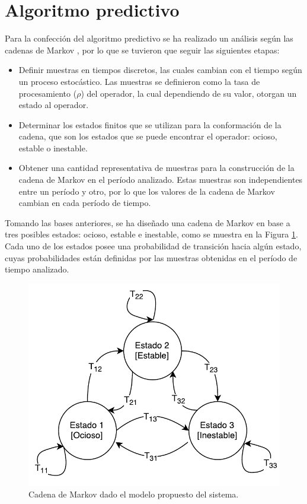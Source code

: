 \section{Algoritmo predictivo}
Para la confecci\'on del algoritmo predictivo se ha realizado un an\'alisis seg\'un las cadenas de Markov \citep{ching2006markov}, por lo que se tuvieron que seguir las siguientes etapas:

\begin{itemize}
	\item Definir muestras en tiempos discretos, las cuales cambian con el tiempo seg\'un un proceso estoc\'astico. Las muestras se definieron como la tasa de procesamiento ($\rho$) del operador, la cual dependiendo de su valor, otorgan un estado al operador.
	\item Determinar los estados finitos que se utilizan para la conformaci\'on de la cadena, que son los estados que se puede encontrar el operador: ocioso, estable o inestable.
	\item Obtener una cantidad representativa de muestras para la construcci\'on de la cadena de Markov en el per\'iodo analizado. Estas muestras son independientes entre un per\'iodo y otro, por lo que los valores de la cadena de Markov cambian en cada per\'iodo de tiempo. %
\end{itemize}

Tomando las bases anteriores, se ha dise\~nado una cadena de Markov en base a tres posibles estados: ocioso, estable e inestable, como se muestra en la Figura \ref{fig:cadenaMarkovPredictiva}. Cada uno de los estados posee una probabilidad de transici\'on hacia alg\'un estado, cuyas probabilidades est\'an definidas por las muestras obtenidas en el per\'iodo de tiempo analizado.

\begin{figure}[ht!]
  \centering
    \includegraphics[scale=0.75]{images/CadenaMarkovPredictiva.pdf}
  \caption{Cadena de Markov dado el modelo propuesto del sistema.}
  \label{fig:cadenaMarkovPredictiva}
\end{figure}

